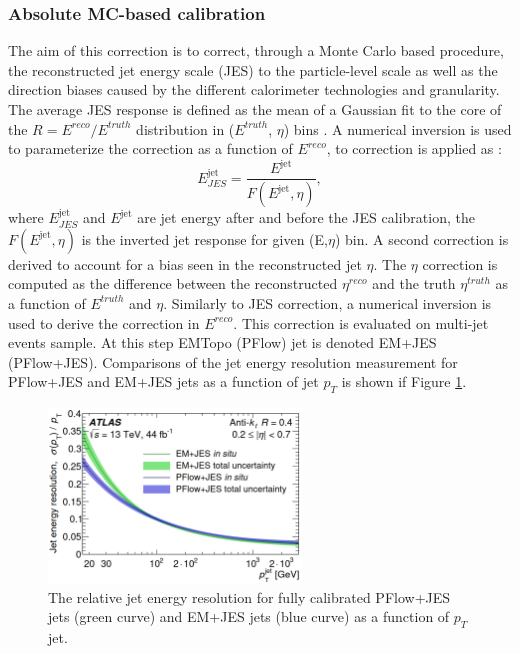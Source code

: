 \subsubsection{Absolute MC-based calibration}
\label{Jet:Cal:chain:JES}
The aim of this correction is to correct, through a Monte Carlo based procedure, the reconstructed jet energy scale (JES) to the particle-level scale as well as the direction biases caused by the different calorimeter technologies and granularity. The average JES response is defined as the mean of a Gaussian fit to the core of the $R=E^{reco}/E^{truth}$ distribution in ($E^{truth}$, $\eta$) bins \cite{Old_JES, Old_JES_Sys}. A numerical inversion is used to parameterize the correction as a function of $E^{reco}$, to correction is applied as : 
\begin{equation}
    E_{JES}^{\mathrm{jet}}=\frac{E^{\mathrm{jet}}}{F(E^{\mathrm{jet}},\eta)},
\end{equation}
where $E_{JES}^{\mathrm{jet}}$ and $E^{\mathrm{jet}}$ are jet energy after and before the JES calibration, the $F(E^{\mathrm{jet}},\eta)$ is the inverted jet response for given (E,$\eta$) bin. A second correction is derived to account for a bias seen in the reconstructed jet $\eta$. The $\eta$ correction is computed as the difference between the reconstructed $\eta^{reco}$ and the truth $\eta^{truth}$ as a function of $E^{truth}$ and $\eta$. Similarly to JES correction, a numerical inversion is used to derive the correction in $E^{reco}$. This correction is evaluated on multi-jet events sample. At this step EMTopo (PFlow) jet is denoted EM+JES (PFlow+JES). Comparisons of the jet energy resolution measurement for PFlow+JES and EM+JES jets as a function of jet $p_T$ is shown if Figure \ref{fig:Jet:Cal:chain:JER}.
\begin{figure}[ht]
    \centering
    \includegraphics[width=0.6\textwidth]{Ch4/Img/Jet_Resolution_Topo_vs_PFlow.png}
    \caption{The relative jet energy resolution for fully calibrated PFlow+JES jets (green curve) and EM+JES jets (blue curve) as a function of $p_T$ jet.}
    \label{fig:Jet:Cal:chain:JER}
\end{figure}
